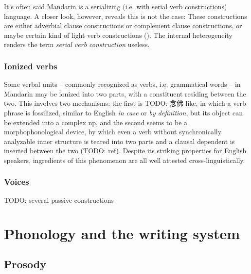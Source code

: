 \documentclass[UTF8, a4paper, oneside, scheme=plain]{ctexrep}
\newcommand*{\term}[1]{\emph{#1}}
\newcommand{\corpus}[1]{\emph{#1}}
\begin{document}
It's often said Mandarin is a serializing (i.e. with serial verb constructions) language.
A closer look, however, reveals this is not the case:
These constructions are either adverbial clause constructions 
or complement clause constructions, 
or maybe certain kind of light verb constructions ().
The internal heterogeneity renders the term \term{serial verb construction} useless.

\subsection{Ionized verbs}

Some verbal units -- commonly recognized as verbs, i.e. grammatical words -- in Mandarin
may be ionized into two parts, 
with a constituent residing between the two. 
This involves two mechanisms:
the first is TODO: 念佛-like, in which a verb phrase is fossilized, 
similar to English \corpus{in case} or \corpus{by definition},  
but its object can be extended into a complex \acs{np},
and the second seems to be a morphophonological device, 
by which even a verb without synchronically analyzable inner structure 
is teared into two parts and a clausal dependent is inserted between the two (TODO: ref).
Despite its striking properties for English speakers, 
ingredients of this phenomenon are all well attested cross-linguistically.

\subsection{Voices}

TODO: several passive constructions

\chapter{Phonology and the writing system}

\section{Prosody}\label{sec:prosody-structure}
\end{document}

